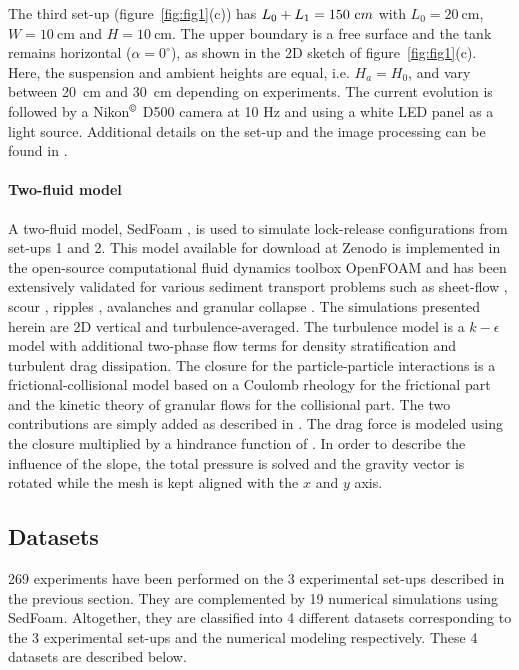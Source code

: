 \documentclass[12pt]{article}
\begin{document}
The third set-up (figure~\ref{fig:fig1}(c)) has $L_0+L_1=150~{\text cm}$ with $L_0 = 20~\textrm{cm}$, $W= 10~\textrm{cm}$ and $H = 10~\textrm{cm}$. The upper boundary is a free surface and the tank remains horizontal ($\alpha = 0^\circ$), as shown in the 2D sketch of figure~\ref{fig:fig1}(c). Here, the suspension and ambient heights are equal, i.e. $H_{a}=H_{0}$, and vary between 20~cm and 30~cm depending on experiments. The current evolution is followed by a Nikon$^\copyright$ D500 camera at 10 Hz and using a white LED panel as a light source. Additional details on the set-up and the image processing can be found in \citet{Schneider2023}.


\paragraph{Two-fluid model}

A two-fluid model, SedFoam \citep{chauchat2017}, is used to simulate lock-release configurations from set-ups 1 and 2. This model available for download at Zenodo \citep{bonamy2023} is implemented in the open-source computational fluid dynamics toolbox OpenFOAM and has been extensively validated for various sediment transport problems such as sheet-flow \citep{cheng2016,chauchat2022,mathieu2021,mathieu2022}, scour \citep{nagel2020,tsai2022}, ripples \citep{salimi2021a,salimi2021b}, avalanches \citep{montella2021} and granular collapse \citep{montella2023}. The simulations presented herein are 2D vertical and turbulence-averaged. The turbulence model is a $k-\epsilon$ model with additional two-phase flow terms for density stratification and turbulent drag dissipation. The closure for the particle-particle interactions is a frictional-collisional model based on a Coulomb rheology for the frictional part and the kinetic theory of granular flows for the collisional part. The two contributions are simply added as described in \cite{chauchat2017}. The drag force is modeled using the \cite{schiller1933} closure multiplied by a hindrance function of \cite{richardson1954}. In order to describe the influence of the slope, the total pressure is solved and the gravity vector is rotated while the mesh is kept aligned with the $x$ and $y$ axis.

\subsection{Datasets}
\label{sec:datasets}

269 experiments have been performed on the 3 experimental set-ups described in the previous section. They are complemented by 19 numerical simulations using SedFoam. Altogether, they are classified into 4 different datasets corresponding to the 3 experimental set-ups and the numerical modeling respectively. These 4 datasets are described below.
\end{document}
